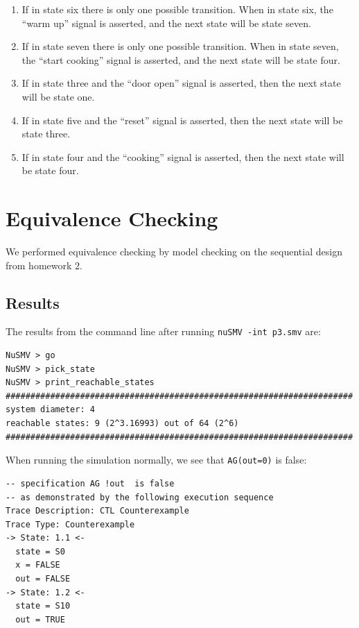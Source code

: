 \documentclass[11pt]{article}
\begin{document}
\begin{enumerate}
\item If in state six there is only one possible transition. When in state six, the “warm up” signal is asserted, and the next state will be state seven.
\item If in state seven there is only one possible transition. When in state seven, the “start cooking” signal is asserted, and the next state will be state four.
\item If in state three and the “door open” signal is asserted, then the next state will be state one.
\item If in state five and the “reset” signal is asserted, then the next state will be state three.
\item If in state four and the “cooking” signal is asserted, then the next state will be state four.
\end{enumerate}	



	
	

%

\section{Equivalence Checking} 
We performed equivalence checking by model checking on the sequential design from homework 2.
\subsection{Results}

The results from the command line after running \texttt{nuSMV -int p3.smv} are:
 \begin{lstlisting}[caption=NuSMV Interactive Output, label=p3_out]	
NuSMV > go
NuSMV > pick_state
NuSMV > print_reachable_states
######################################################################
system diameter: 4
reachable states: 9 (2^3.16993) out of 64 (2^6)
######################################################################
\end{lstlisting}

When running the simulation normally, we see that \texttt{AG(out=0)} is false:
 \begin{lstlisting}[caption=NuSMV Interactive Output, label=p3_out]	
-- specification AG !out  is false
-- as demonstrated by the following execution sequence
Trace Description: CTL Counterexample
Trace Type: Counterexample
-> State: 1.1 <-
  state = S0
  x = FALSE
  out = FALSE
-> State: 1.2 <-
  state = S10
  out = TRUE
\end{lstlisting}



%  
\end{document}
